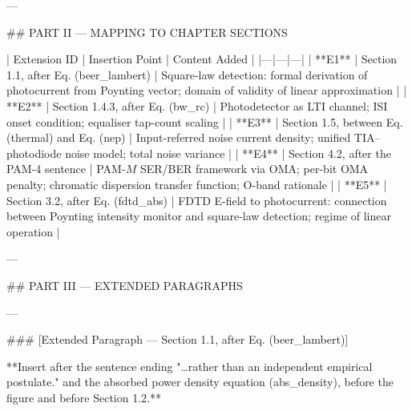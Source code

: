 ---

## PART II — MAPPING TO CHAPTER SECTIONS

| Extension ID | Insertion Point | Content Added |
|---|---|---|
| **E1** | Section 1.1, after Eq. (beer\_lambert) | Square-law detection: formal derivation of photocurrent from Poynting vector; domain of validity of linear approximation |
| **E2** | Section 1.4.3, after Eq. (bw\_rc) | Photodetector as LTI channel; ISI onset condition; equaliser tap-count scaling |
| **E3** | Section 1.5, between Eq. (thermal) and Eq. (nep) | Input-referred noise current density; unified TIA–photodiode noise model; total noise variance |
| **E4** | Section 4.2, after the PAM-4 sentence | PAM-$M$ SER/BER framework via OMA; per-bit OMA penalty; chromatic dispersion transfer function; O-band rationale |
| **E5** | Section 3.2, after Eq. (fdtd\_abs) | FDTD E-field to photocurrent: connection between Poynting intensity monitor and square-law detection; regime of linear operation |

---

## PART III — EXTENDED PARAGRAPHS

---

### [Extended Paragraph — Section 1.1, after Eq. (beer\_lambert)]

**Insert after the sentence ending "…rather than an independent empirical postulate." and the absorbed power density equation (abs\_density), before the figure and before Section 1.2.**

